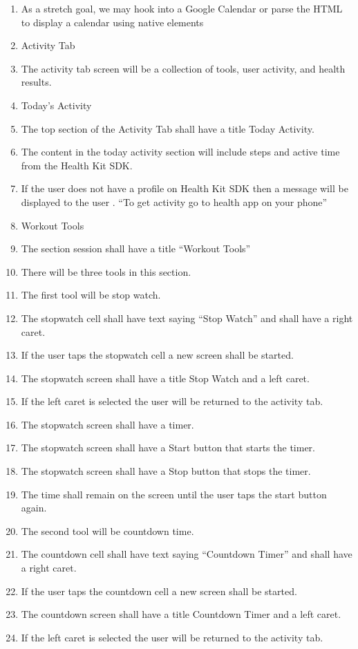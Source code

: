 \documentclass[letterpaper,10pt,titlepage]{article}
\begin{document}
\begin{enumerate}
\item As a stretch goal, we may hook into a Google Calendar or parse the HTML to display a calendar using native elements
\item Activity Tab
\item The activity tab screen will be a collection of tools, user activity, and health results.
\item Today’s Activity
\item The top section of the Activity Tab shall have a title Today Activity.
\item The content in the today activity section will include steps and active time from the Health Kit SDK.
\item If the user does not have a profile on Health Kit SDK then a message will be displayed to the user .  “To get activity go to health app on your phone”
\item Workout Tools
\item The section session shall have a title “Workout Tools”
\item There will be three tools in this section.
\item The first tool will be stop watch.
\item The stopwatch cell shall have text saying “Stop Watch” and shall have a right caret.
\item If the user taps the stopwatch cell a new screen shall be started.
\item The stopwatch screen shall have a title Stop Watch and a left caret.
\item If the left caret is selected the user will be returned to the activity tab.
\item The stopwatch screen shall have a timer.
\item The stopwatch screen shall have a Start button that starts the timer.
\item The stopwatch screen shall have a Stop button that stops the timer.
\item The time shall remain on the screen until the user taps the start button again.
\item The second tool will be countdown time.
\item The countdown cell shall have text saying “Countdown Timer” and shall have a right caret.
\item If the user taps the countdown cell a new screen shall be started.
\item The countdown screen shall have a title Countdown Timer and a left caret.
\item If the left caret is selected the user will be returned to the activity tab.

\end{enumerate}
\end{document}
